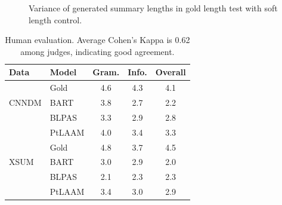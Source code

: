 \begin{figure}[!ht]
	\centering
	\scriptsize
	\caption{Variance of generated summary lengths in gold length test with soft length control.}
	\label{fig:var}
\end{figure}

\begin{table}[th]
	\centering
	\scriptsize
	\begin{tabular}{|l|l|ccc|}
		\hline
		\bf Data & \bf Model & \bf Gram. & \bf Info. & \bf Overall \\
		\hline
		\multirow{3}{*}{CNNDM}&Gold& 4.6 & 4.3 & 4.1 \\
		&BART& 3.8 & 2.7 & 2.2 \\
		&BLPAS & 3.3 & 2.9 & 2.8  \\
	    &PtLAAM & 4.0 &3.4 & 3.3  \\
		\hline
		\multirow{3}{*}{XSUM}&Gold& 4.8 & 3.7 & 4.5 \\
		&BART& 3.0 & 2.9 & 2.0 \\
		&BLPAS & 2.1& 2.3 & 2.3 \\
		&PtLAAM & 3.4 & 3.0 & 2.9  \\
		\hline
	\end{tabular}
	\caption{Human evaluation. Average Cohen's Kappa is 0.62 among judges,
	indicating good agreement. }
	\label{tab:human}  
\end{table}

